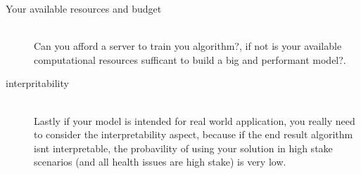 \begin{description}
        \item [Your available resources and budget] \hfill \\
            Can you afford a server to train you algorithm?, if not is your available computational resources sufficant to build a big and performant model?.
        \item [interpritability] \hfill \\
            Lastly if your model is intended for real world application, you really need to consider the interpretability aspect, because if the end result algorithm isnt interpretable, the probavility of using your solution in high stake scenarios (and all health issues are high stake) is very low.
    \end{description}